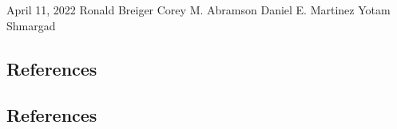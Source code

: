 \documentclass[dissertation, figuresright]{uathesis}
\begin{document}

\approval
{April 11, 2022}		%
{Ronald Breiger}	%
{Corey M. Abramson}	    %
{Daniel E. Martinez}	%
{Yotam Shmargad}		%



\tableofcontents

\listoffigures

\listoftables


\begin{refsection} %

\newpage
\section{References}
\begin{singlespace}
\printbibliography[heading=none] %
\end{singlespace}
\end{refsection}

\appendix

\begin{refsection} %

\newpage
\section{References}
\begin{singlespace}
\printbibliography[heading=none] %
\end{singlespace}
\end{refsection}
\end{document}
